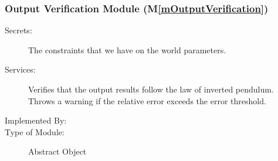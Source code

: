 \documentclass[12pt, titlepage]{article}
\newcommand{\mref}[1]{M\ref{#1}}
\begin{document}




\subsubsection{Output Verification Module (\mref{mOutputVerification})}

\begin{description}
\item[Secrets:] The constraints that we have on the world parameters.
\item[Services:] Verifies that the output results follow the law of inverted pendulum.
                 Throws a warning if the relative error exceeds the error threshold.
\item[Implemented By:] \progname{}
\item[Type of Module:] Abstract Object
\end{description}
\end{document}
